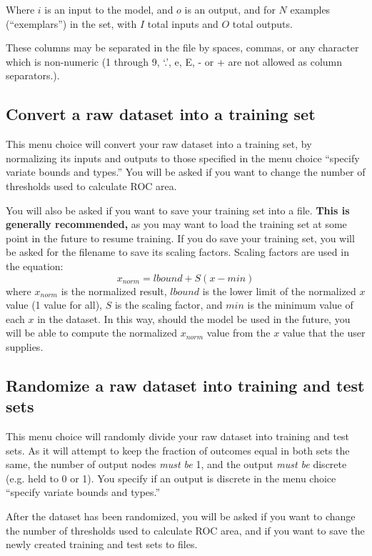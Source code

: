 Where $i$ is an input to the model, and $o$ is an output, and for $N$
examples (``exemplars'') in the set, with $I$ total inputs and $O$
total outputs.

These columns may be separated in the file by spaces, commas, or any
character which is non-numeric (1 through 9, `.', e, E, - or + are not
allowed as column separators.).

\subsection{Convert a raw dataset into a training set}

This menu choice will convert your raw dataset into a training set, by
normalizing its inputs and outputs to those specified in the menu
choice ``specify variate bounds and types.''  You will be asked if you
want to change the number of thresholds used to calculate ROC area.

You will also be asked if you want to save your training set into
a file.  {\bf This is generally recommended,} as you may want to load
the training set at some point in the future to resume training.
If you do save your training set, you will be asked for the filename
to save its scaling factors.  Scaling factors are used in the equation:
\begin{equation}\label{driverScale}
x_{norm} = lbound + S(x - min)
\end{equation}
where $x_{norm}$ is the normalized result, $lbound$ is the lower limit
of the normalized $x$ value (1 value for all), $S$ is the scaling
factor, and $min$ is the minimum value of each $x$ in the dataset. In
this way, should the model be used in the future, you will be able to
compute the normalized $x_{norm}$ value from the $x$ value that the
user supplies.

\subsection{Randomize a raw dataset into training and test sets}

This menu choice will randomly divide your raw dataset into training
and test sets.  As it will attempt to keep the fraction of outcomes
equal in both sets the same, the number of output nodes {\em must be}
1, and the output {\em must be} discrete (e.g. held to 0 or 1).  You
specify if an output is discrete in the menu choice ``specify variate
bounds and types.''

After the dataset has been randomized, you will be asked if you want
to change the number of thresholds used to calculate ROC area, and if
you want to save the newly created training and test sets to files.

